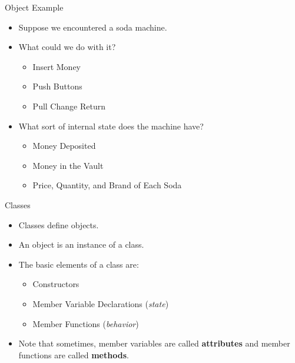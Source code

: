 \documentclass[]{beamer}
\begin{document}
\begin{frame}{Object Example}
    \begin{itemize}[<+->]
        \item Suppose we encountered a soda machine.
        \item What could we do with it?
        \begin{itemize}
            \item Insert Money
            \item Push Buttons
            \item Pull Change Return
        \end{itemize}
        \item What sort of internal state does the machine have?
        \begin{itemize}
            \item Money Deposited
            \item Money in the Vault
            \item Price, Quantity, and Brand of Each Soda
        \end{itemize}
    \end{itemize}
\end{frame}

\begin{frame}{Classes}
    \begin{itemize}[<+->]
        \item Classes define objects.
        \item An object is an instance of a class.
        \item The basic elements of a class are:
        \begin{itemize}[<+->]
            \item Constructors 
            \item Member Variable Declarations ({\em state})
            \item Member Functions ({\em behavior})
        \end{itemize}
        \item Note that sometimes, member variables are called
            \textbf{attributes} and member functions are called
            \textbf{methods}.
    \end{itemize}
\end{frame}
\end{document}
